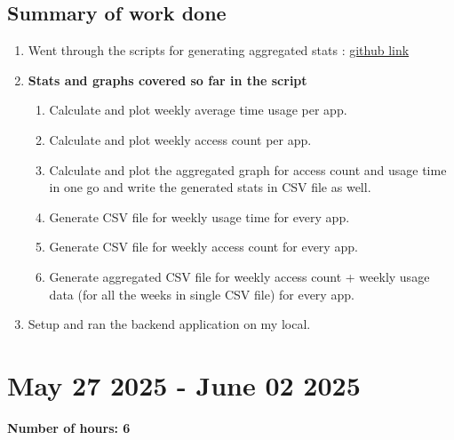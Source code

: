 \documentclass[12pt]{article}
\begin{document}
    \subsection{Summary of work done}
    \begin{enumerate}
        \item Went through the scripts for generating aggregated stats : \href{https://github.com/onkarkadam158/intentor_server/blob/4e6749e3291997326d7586ecbd8b69a69910b846/dashboard/scripts/show_aggregate_data.py}{github link}
       \item \textbf{Stats and graphs covered so far in the script}
       \begin{enumerate}
           \item Calculate and  plot weekly average time usage per app.
            \item Calculate and plot weekly access count per app.
            \item Calculate and plot the aggregated graph for access count and usage time in one go and write the generated stats in CSV file as well.
            \item Generate CSV file for weekly usage time for every app.
             \item Generate CSV file for weekly access count for every app.
              \item Generate aggregated CSV file for weekly access count + weekly usage data (for all the weeks in single CSV   file)  for every app.
       \end{enumerate}
    \item Setup and ran the backend application on my local.
    \end{enumerate}
    \section{May 27 2025 - June 02 2025}
    {\bf Number of hours: 6}
\end{document}
